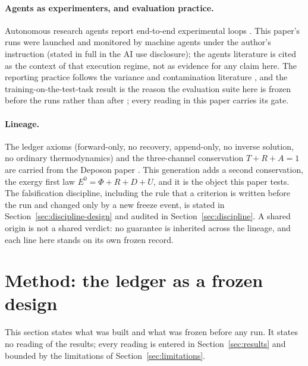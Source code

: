 \documentclass[11pt,a4paper]{article}
\newcommand{\Ezero}{E^{0}}
\begin{document}
\paragraph{Agents as experimenters, and evaluation practice.}
Autonomous research agents report end-to-end experimental loops \citep{aiscientist2024,aiscientistv2,coscientist2025,agentlab2025,boiko2023}. This paper's runs were launched and monitored by machine agents under the author's instruction (stated in full in the AI use disclosure); the agents literature is cited as the context of that execution regime, not as evidence for any claim here. The reporting practice follows the variance and contamination literature \citep{henderson2018,bouthillier2021,dodge2019,magar2022,deng2024}, and the training-on-the-test-task result is the reason the evaluation suite here is frozen before the runs rather than after \citep{testtask2025}; every reading in this paper carries its gate.

\paragraph{Lineage.}
The ledger axioms (forward-only, no recovery, append-only, no inverse solution, no ordinary thermodynamics) and the three-channel conservation $T+R+A=1$ are carried from the Deposon paper \citep{deposon2026}. This generation adds a second conservation, the exergy first law $\Ezero=\Phi+R+D+U$, and it is the object this paper tests. The falsification discipline, including the rule that a criterion is written before the run and changed only by a new freeze event, is stated in Section~\ref{sec:discipline-design} and audited in Section~\ref{sec:discipline}. A shared origin is not a shared verdict: no guarantee is inherited across the lineage, and each line here stands on its own frozen record.

\section{Method: the ledger as a frozen design}
\label{sec:method}

This section states what was built and what was frozen before any run. It states no reading of the results; every reading is entered in Section~\ref{sec:results} and bounded by the limitations of Section~\ref{sec:limitations}.
\end{document}
